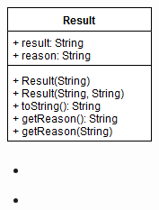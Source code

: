 \documentclass[parskip=full]{scrartcl}
\begin{document}
		\begin{minipage}{\linewidth}
			\centering
			\includegraphics[width=1\linewidth]{Diagramme/Result}
			\label{fig:result}
		\end{minipage}
		\begin{itemize}
			\item
				\begin{description}
				
				\end{description}
			\item
				\begin{description}
				
				\end{description}
		\end{itemize}
		\newpage
		
\end{document}
